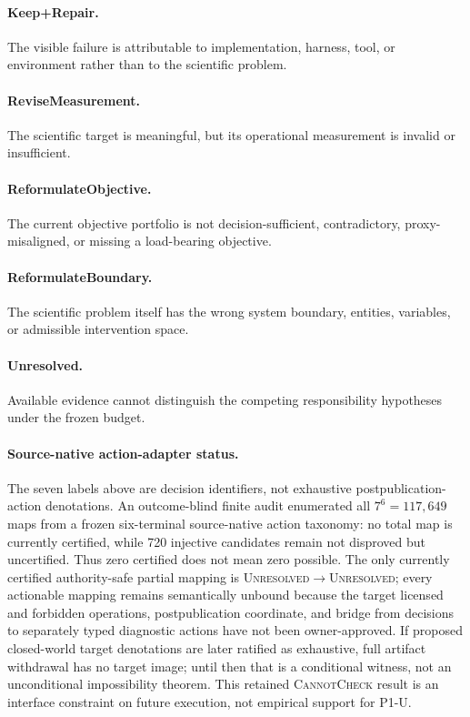 \documentclass[11pt]{article}
\begin{document}
\paragraph{Keep+Repair.}
The visible failure is attributable to implementation, harness, tool, or environment rather than to the scientific problem.

\paragraph{ReviseMeasurement.}
The scientific target is meaningful, but its operational measurement is invalid or insufficient.

\paragraph{ReformulateObjective.}
The current objective portfolio is not decision-sufficient, contradictory, proxy-misaligned, or missing a load-bearing objective.

\paragraph{ReformulateBoundary.}
The scientific problem itself has the wrong system boundary, entities, variables, or admissible intervention space.

\paragraph{Unresolved.}
Available evidence cannot distinguish the competing responsibility hypotheses under the frozen budget.

\paragraph{Source-native action-adapter status.}
The seven labels above are decision identifiers, not exhaustive
postpublication-action denotations. An outcome-blind finite audit enumerated all
$7^6=117{,}649$ maps from a frozen six-terminal source-native action taxonomy:
no total map is currently certified, while 720 injective candidates remain not
disproved but uncertified. Thus zero certified does not mean zero possible. The
only currently certified authority-safe partial mapping is
\textsc{Unresolved}$\rightarrow$\textsc{Unresolved}; every actionable mapping
remains semantically unbound because the target licensed and forbidden
operations, postpublication coordinate, and bridge from decisions to separately
typed diagnostic actions have not been owner-approved. If proposed closed-world
target denotations are later ratified as exhaustive, full artifact withdrawal
has no target image; until then that is a conditional witness, not an
unconditional impossibility theorem. This retained \textsc{CannotCheck} result
is an interface constraint on future execution, not empirical support for P1-U.
\end{document}
